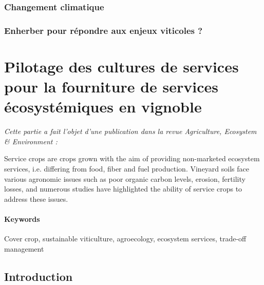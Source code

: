 \subsubsection{Changement climatique}

\subsubsection{Enherber pour répondre aux enjeux viticoles ?}


\newpage

\section{Pilotage des cultures de services pour la fourniture de services écosystémiques en vignoble}

\noindent\textit{Cette partie a fait l'objet d'une publication dans la revue Agriculture, Ecosystem \& Environment :}

\small



\normalsize


Service crops are crops grown with the aim of providing non-marketed ecosystem services, i.e. differing from food, fiber and fuel production. Vineyard soils face various agronomic issues such as poor organic carbon levels, erosion, fertility losses, and numerous studies have highlighted the ability of service crops to address these issues.

\paragraph{Keywords}

Cover crop, sustainable viticulture, agroecology, ecosystem services, trade-off management

\subsection{Introduction}


